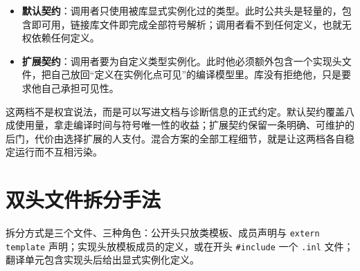 \documentclass[12pt,a4paper,fontset=fandol]{ctexbook}
\newcommand{\kw}[1]{\texttt{#1}}
\begin{document}
\begin{itemize}
\item \textbf{默认契约}：调用者只使用被库显式实例化过的类型。此时公共头是轻量的，包含即可用，链接库文件即完成全部符号解析；调用者看不到任何定义，也就无权依赖任何定义。
\item \textbf{扩展契约}：调用者要为自定义类型实例化。此时他必须额外包含一个实现头文件，把自己放回“定义在实例化点可见”的编译模型里。库没有拒绝他，只是要求他自己承担可见性。
\end{itemize}

这两档不是权宜说法，而是可以写进文档与诊断信息的正式约定。默认契约覆盖八成使用量，拿走编译时间与符号唯一性的收益；扩展契约保留一条明确、可维护的后门，代价由选择扩展的人支付。混合方案的全部工程细节，就是让这两档各自稳定运行而不互相污染。

\section{双头文件拆分手法}

拆分方式是三个文件、三种角色：公开头只放类模板、成员声明与 \kw{extern template} 声明；实现头放模板成员的定义，或在开头 \kw{\#include} 一个 \kw{.inl} 文件；翻译单元包含实现头后给出显式实例化定义。
\end{document}

